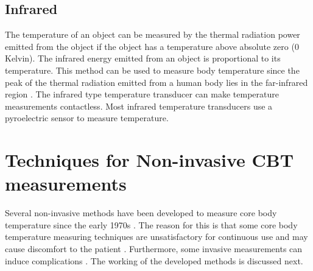\subsection{Infrared}
The temperature of an object can be measured by the thermal radiation power emitted from the object if the object has a temperature above absolute zero (0 Kelvin). The infrared energy emitted from an object is proportional to its temperature. This method can be used to measure body temperature since the peak of the thermal radiation emitted from a human body lies in the far-infrared region \cite{Chen2019}. The infrared type temperature transducer can make temperature measurements contactless. Most infrared temperature transducers use a pyroelectric sensor to measure temperature. 


\section{Techniques for Non-invasive CBT measurements}\label{Sec2_4}
Several non-invasive methods have been developed to measure core body temperature since the early 1970s \cite{Chen2019}. The reason for this is that some core body temperature measuring techniques are unsatisfactory for continuous use and may cause discomfort to the patient \cite{Yamakage2003}. Furthermore, some invasive measurements can induce complications \cite{complications}. The working of the developed methods is discussed next. 


